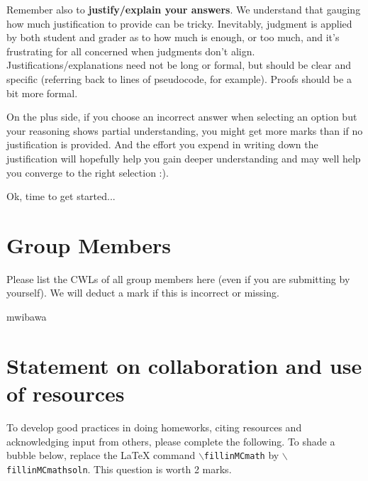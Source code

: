 \documentclass[11pt,fleqn]{exam}
\begin{document}
	Remember also  to \textbf{justify/explain  your answers}. We  understand that  gauging how
	much  justification to  provide can  be tricky.  Inevitably, judgment  is applied  by both
	student and  grader as to how  much is enough, or  too much, and it's  frustrating for all
	concerned  when judgments  don't align.  Justifications/explanations need  not be  long or
	formal, but  should be  clear and  specific (referring  back to  lines of  pseudocode, for
	example). Proofs should be a bit more formal.
	
	On the  plus side, if  you choose an  incorrect answer when  selecting an option  but your
	reasoning shows partial  understanding, you might get more marks  than if no justification
	is provided. And  the effort you expend  in writing down the  justification will hopefully
	help you gain deeper  understanding and may well help you converge  to the right selection
	:).
	
	\vspace{.1in}
	
	Ok, time to get started...
	
	\clearpage
	
	\section*{Group Members}
	
	Please list the CWLs of all group members here (even if you are submitting by yourself). We will deduct a mark if this is incorrect or missing.
	
	mwibawa

 \section{Statement on collaboration and use of resources}
To develop good practices in doing homeworks,
citing resources and acknowledging input from others, please complete the following. To shade a bubble below, replace the LaTeX command \texttt{$\backslash$fillinMCmath} by \texttt{$\backslash$fillinMCmathsoln}.
This question is worth 2 marks.
\end{document}
